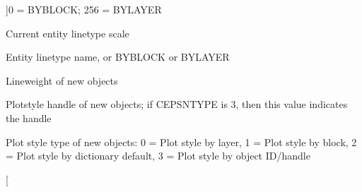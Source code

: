 \begin{Desc}
\begin{description}
{}]0 = B\+Y\+B\+L\+O\+CK; 256 = B\+Y\+L\+A\+Y\+ER \item[{\em 
C\+E\+L\+T\+S\+C\+A\+LE\hypertarget{class_c_a_d_header_abd894aab7aa85b4c4634e67fb93d6886a54b0492ee3fd90097137c82f5971f674}{}\label{class_c_a_d_header_abd894aab7aa85b4c4634e67fb93d6886a54b0492ee3fd90097137c82f5971f674}
}]Current entity linetype scale \item[{\em 
C\+E\+L\+T\+Y\+PE\hypertarget{class_c_a_d_header_abd894aab7aa85b4c4634e67fb93d6886a4239205cf0507d30e15d16a437ff95e5}{}\label{class_c_a_d_header_abd894aab7aa85b4c4634e67fb93d6886a4239205cf0507d30e15d16a437ff95e5}
}]Entity linetype name, or B\+Y\+B\+L\+O\+CK or B\+Y\+L\+A\+Y\+ER \item[{\em 
C\+E\+L\+W\+E\+I\+G\+HT\hypertarget{class_c_a_d_header_abd894aab7aa85b4c4634e67fb93d6886a6e76da81b5369a9b9fd5a2e7c1771a06}{}\label{class_c_a_d_header_abd894aab7aa85b4c4634e67fb93d6886a6e76da81b5369a9b9fd5a2e7c1771a06}
}]Lineweight of new objects \item[{\em 
C\+E\+P\+S\+N\+ID\hypertarget{class_c_a_d_header_abd894aab7aa85b4c4634e67fb93d6886a465dae989fc175e2946fd056631ecb12}{}\label{class_c_a_d_header_abd894aab7aa85b4c4634e67fb93d6886a465dae989fc175e2946fd056631ecb12}
}]Plotstyle handle of new objects; if C\+E\+P\+S\+N\+T\+Y\+PE is 3, then this value indicates the handle \item[{\em 
C\+E\+P\+S\+N\+T\+Y\+PE\hypertarget{class_c_a_d_header_abd894aab7aa85b4c4634e67fb93d6886ab7f7c6192148fc397662116c93e240ef}{}\label{class_c_a_d_header_abd894aab7aa85b4c4634e67fb93d6886ab7f7c6192148fc397662116c93e240ef}
}]Plot style type of new objects\+: 0 = Plot style by layer, 1 = Plot style by block, 2 = Plot style by dictionary default, 3 = Plot style by object I\+D/handle \item[{\em 
}
\end{description}
\end{Desc}
